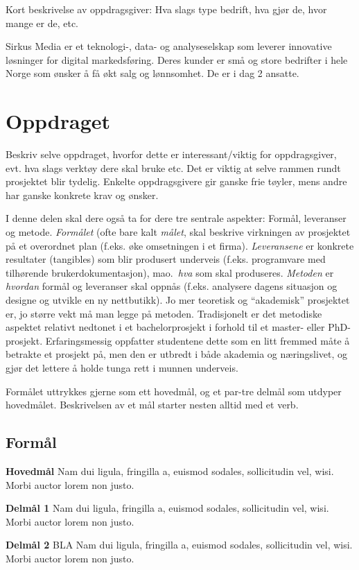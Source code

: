 \documentclass[11pt,a4paper]{report}
\begin{document}
Kort beskrivelse av oppdragsgiver: Hva slags type bedrift, hva gjør de, hvor mange er de, etc.

Sirkus Media er et teknologi-, data- og analyseselskap som leverer innovative løsninger for digital markedsføring. Deres kunder er små og store bedrifter i hele Norge som ønsker å få økt salg og lønnsomhet. De er i dag 2 ansatte. 

\lipsum[3-4]

\section*{Oppdraget}

Beskriv selve oppdraget, hvorfor dette er interessant/viktig for oppdragsgiver, evt. hva slags verktøy dere skal bruke etc. Det er viktig at selve rammen rundt prosjektet blir tydelig. Enkelte oppdragsgivere gir ganske frie tøyler, mens andre har ganske konkrete krav og ønsker.

I denne delen skal dere også ta for dere  tre sentrale aspekter: Formål, leveranser og metode. {\em Formålet} (ofte bare kalt {\em målet}, skal beskrive virkningen av prosjektet på et overordnet plan (f.eks. øke omsetningen i et firma). 
{\em Leveransene} er konkrete resultater (tangibles) som blir produsert underveis (f.eks. programvare med tilhørende brukerdokumentasjon), mao.\ {\em hva} som skal produseres. 
{\em Metoden} er {\em hvordan} formål og leveranser skal oppnås (f.eks. analysere dagens situasjon og designe og utvikle en ny nettbutikk). 
Jo mer teoretisk og ``akademisk'' prosjektet er, jo større vekt må man legge på metoden. Tradisjonelt er det metodiske aspektet relativt nedtonet i et bachelorprosjekt i forhold til et master- eller PhD-prosjekt.
Erfaringsmessig oppfatter studentene dette som en litt fremmed måte å betrakte et prosjekt på, men den er utbredt i både akademia og næringslivet, og gjør det lettere å holde tunga rett i munnen underveis. 

Formålet uttrykkes gjerne som ett hovedmål, og et par-tre delmål som utdyper hovedmålet. Beskrivelsen av et mål starter nesten alltid med et verb.


\subsection*{Formål}

\begin{compactitem}
\item [{\bf Hovedmål}] Nam dui ligula, fringilla a, euismod sodales, sollicitudin vel, wisi. Morbi
auctor lorem non justo.
\begin{compactitem}
\item [{\bf  Delmål 1} ] Nam dui ligula, fringilla a, euismod sodales, sollicitudin vel, wisi. Morbi
auctor lorem non justo.
\item [{\bf  Delmål 2} ] BLA Nam dui ligula, fringilla a, euismod sodales, sollicitudin vel, wisi. Morbi
auctor lorem non justo.
\end{compactitem}
\end{compactitem}
\end{document}
